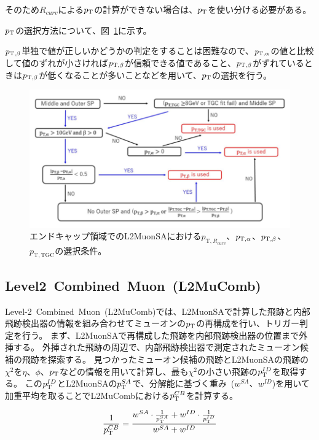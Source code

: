 そのため$R_{curv}$による$p_\mathrm{T}$の計算ができない場合は、$p_\mathrm{T}$を使い分ける必要がある。

$p_\mathrm{T}$の選択方法について、図~\ref{fig:3-11}に示す。

$p_{\mathrm{T}, \beta}$単独で値が正しいかどうかの判定をすることは困難なので、$p_{\mathrm{T}, \alpha}$の値と比較して値のずれが小さければ$p_{\mathrm{T}, \beta}$が信頼できる値であること、$p_{\mathrm{T}, \beta}$がずれているときは$p_{\mathrm{T}, \beta}$が低くなることが多いことなどを用いて、$p_\mathrm{T}$の選択を行う。

\begin{figure}[h]
  \centering
  \includegraphics[clip, width=14cm]{fig/3/l2muonSA_pTselection.png}
  \caption{エンドキャップ領域でのL2MuonSAにおける$p_{\mathrm{T},R_{curv}}$、$p_{\mathrm{T}, \alpha}$、$p_{\mathrm{T}, \beta}$、$p_{\mathrm{T,TGC}}$の選択条件\cite{article:wakamiya}。}
  \label{fig:3-11}
\end{figure}


\subsection{Level2~Combined~Muon~(L2MuComb)}\label{chapter3-2-3}
Level-2~Combined~Muon~(L2MuComb)では、L2MuonSAで計算した飛跡と内部飛跡検出器の情報を組み合わせてミューオンの$p_\mathrm{T}$の再構成を行い、トリガー判定を行う。
まず、L2MuonSAで再構成した飛跡を内部飛跡検出器の位置まで外挿する。
外挿された飛跡の周辺で、内部飛跡検出器で測定されたミューオン候補の飛跡を探索する。
見つかったミューオン候補の飛跡とL2MuonSAの飛跡の$\chi^2$を$\eta$、$\phi$、$p_\mathrm{T}$などの情報を用いて計算し、最も$\chi^2$の小さい飛跡の$p_\mathrm{T}^{ID}$を取得する。
この$p_\mathrm{T}^{ID}$とL2MuonSAの$p_\mathrm{T}^{SA}$で、分解能に基づく重み~($w^{SA}$、$w^{ID}$)を用いて加重平均を取ることでL2MuCombにおける$p_\mathrm{T}^{CB}$を計算する。

\begin{equation}
    \frac{1}{p_\mathrm{T}^{C B}}=\frac{w^{S A} \cdot \frac{1}{p_\mathrm{T}^{S A}}+w^{I D} \cdot \frac{1}{p_\mathrm{T}^{I D}}}{w^{S A}+w^{I D}}
\end{equation}

